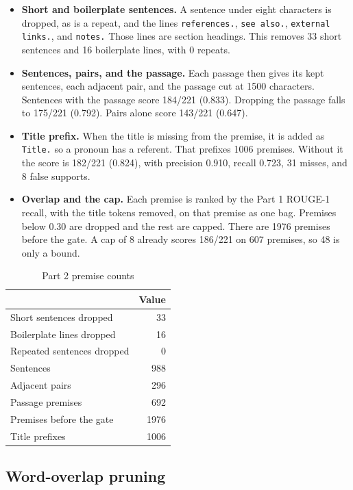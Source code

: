 \begin{itemize}\setlength{\itemsep}{0.4em}
\item \textbf{Short and boilerplate sentences.}
A sentence under eight characters is dropped, as is a repeat, and the lines \texttt{references.}, \texttt{see also.}, \texttt{external links.}, and \texttt{notes.}
Those lines are section headings. This removes 33 short sentences and 16 boilerplate lines, with 0 repeats.
\item \textbf{Sentences, pairs, and the passage.}
Each passage then gives its kept sentences, each adjacent pair, and the passage cut at 1500 characters.
Sentences with the passage score 184/221 (0.833). Dropping the passage falls to 175/221 (0.792). Pairs alone score 143/221 (0.647).
\item \textbf{Title prefix.}
When the title is missing from the premise, it is added as \texttt{Title.} so a pronoun has a referent.
That prefixes 1006 premises. Without it the score is 182/221 (0.824), with precision 0.910, recall 0.723, 31 misses, and 8 false supports.
\item \textbf{Overlap and the cap.}
Each premise is ranked by the Part 1 ROUGE-1 recall, with the title tokens removed, on that premise as one bag. Premises below 0.30 are dropped and the rest are capped.
There are 1976 premises before the gate. A cap of 8 already scores 186/221 on 607 premises, so 48 is only a bound.
\end{itemize}

\begin{table}[H]
\centering
\caption{Part 2 premise counts}
\label{tab:premcounts}
\small
\begin{tabular}{@{}lr@{}}
\toprule
 & Value \\
\midrule
Short sentences dropped & 33 \\
Boilerplate lines dropped & 16 \\
Repeated sentences dropped & 0 \\
Sentences & 988 \\
Adjacent pairs & 296 \\
Passage premises & 692 \\
Premises before the gate & 1976 \\
Title prefixes & 1006 \\
\bottomrule
\end{tabular}
\end{table}

\subsection{Word-overlap pruning}

